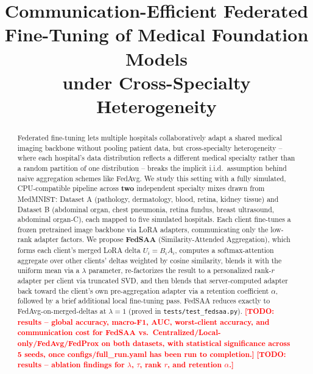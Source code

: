 \documentclass[11pt]{article}
\title{Communication-Efficient Federated Fine-Tuning of Medical Foundation Models\\
under Cross-Specialty Heterogeneity}
\author{\todo{author names / affiliations}}
\date{}
\newcommand{\todoresults}[1]{\textcolor{red}{\textbf{[TODO: results -- #1]}}}
\begin{document}
\maketitle


\begin{abstract}
Federated fine-tuning lets multiple hospitals collaboratively adapt a shared medical imaging
backbone without pooling patient data, but cross-specialty heterogeneity -- where each hospital's
data distribution reflects a different medical specialty rather than a random partition of one
distribution -- breaks the implicit i.i.d.\ assumption behind naive aggregation schemes like
FedAvg. We study this setting with a fully simulated, CPU-compatible pipeline across
\textbf{two} independent specialty mixes drawn from MedMNIST: Dataset A (pathology, dermatology,
blood, retina, kidney tissue) and Dataset B (abdominal organ, chest pneumonia, retina fundus,
breast ultrasound, abdominal organ-C), each mapped to five simulated hospitals. Each client
fine-tunes a frozen pretrained image backbone via LoRA adapters, communicating only the low-rank
adapter factors. We propose \textbf{FedSAA} (Similarity-Attended Aggregation), which forms each
client's merged LoRA delta $U_i = B_iA_i$, computes a softmax-attention aggregate over other
clients' deltas weighted by cosine similarity, blends it with the uniform mean via a $\lambda$
parameter, re-factorizes the result to a personalized rank-$r$ adapter per client via truncated
SVD, and then blends that server-computed adapter back toward the client's own pre-aggregation
adapter via a retention coefficient $\alpha$, followed by a brief additional local fine-tuning
pass. FedSAA reduces exactly to FedAvg-on-merged-deltas at $\lambda=1$ (proved in
\texttt{tests/test\_fedsaa.py}).
\todoresults{global accuracy, macro-F1, AUC, worst-client accuracy, and communication cost for
FedSAA vs.\ Centralized/Local-only/FedAvg/FedProx on both datasets, with statistical significance
across 5 seeds, once configs/full\_run.yaml has been run to completion.}
\todoresults{ablation findings for $\lambda$, $\tau$, rank $r$, and retention $\alpha$.}
\end{abstract}
\end{document}
